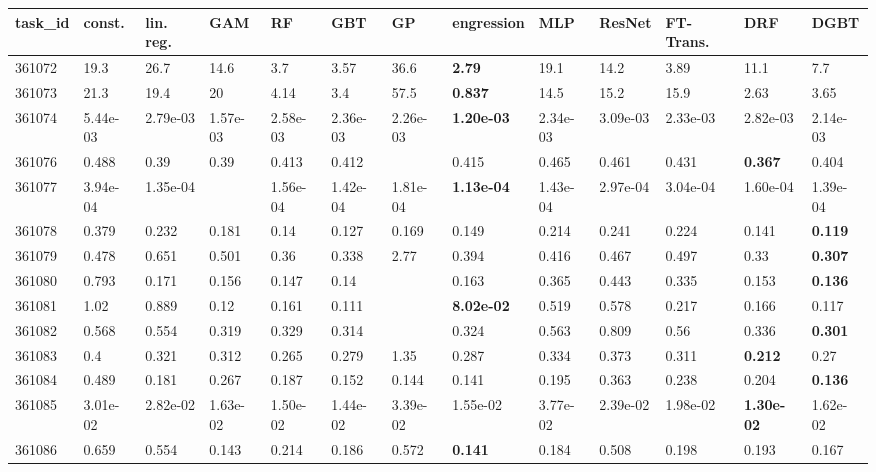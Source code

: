 \begin{table}[ht!]
\centering
\begingroup\footnotesize
\begin{tabular}{lllllllllllll}
  \hline
\hline
task\_id & const. & lin. reg. & GAM & RF & GBT & GP & engression & MLP & ResNet & FT-Trans. & DRF & DGBT \\ 
  \hline
361072 & 19.3 & 26.7 & 14.6 & 3.7 & 3.57 & 36.6 & \textbf{2.79} & 19.1 & 14.2 & 3.89 & 11.1 & 7.7 \\ 
  361073 & 21.3 & 19.4 & 20 & 4.14 & 3.4 & 57.5 & \textbf{0.837} & 14.5 & 15.2 & 15.9 & 2.63 & 3.65 \\ 
  361074 & 5.44e-03 & 2.79e-03 & 1.57e-03 & 2.58e-03 & 2.36e-03 & 2.26e-03 & \textbf{1.20e-03} & 2.34e-03 & 3.09e-03 & 2.33e-03 & 2.82e-03 & 2.14e-03 \\ 
  361076 & 0.488 & 0.39 & 0.39 & 0.413 & 0.412 &  & 0.415 & 0.465 & 0.461 & 0.431 & \textbf{0.367} & 0.404 \\ 
  361077 & 3.94e-04 & 1.35e-04 &  & 1.56e-04 & 1.42e-04 & 1.81e-04 & \textbf{1.13e-04} & 1.43e-04 & 2.97e-04 & 3.04e-04 & 1.60e-04 & 1.39e-04 \\ 
  361078 & 0.379 & 0.232 & 0.181 & 0.14 & 0.127 & 0.169 & 0.149 & 0.214 & 0.241 & 0.224 & 0.141 & \textbf{0.119} \\ 
  361079 & 0.478 & 0.651 & 0.501 & 0.36 & 0.338 & 2.77 & 0.394 & 0.416 & 0.467 & 0.497 & 0.33 & \textbf{0.307} \\ 
  361080 & 0.793 & 0.171 & 0.156 & 0.147 & 0.14 &  & 0.163 & 0.365 & 0.443 & 0.335 & 0.153 & \textbf{0.136} \\ 
  361081 & 1.02 & 0.889 & 0.12 & 0.161 & 0.111 &  & \textbf{8.02e-02} & 0.519 & 0.578 & 0.217 & 0.166 & 0.117 \\ 
  361082 & 0.568 & 0.554 & 0.319 & 0.329 & 0.314 &  & 0.324 & 0.563 & 0.809 & 0.56 & 0.336 & \textbf{0.301} \\ 
  361083 & 0.4 & 0.321 & 0.312 & 0.265 & 0.279 & 1.35 & 0.287 & 0.334 & 0.373 & 0.311 & \textbf{0.212} & 0.27 \\ 
  361084 & 0.489 & 0.181 & 0.267 & 0.187 & 0.152 & 0.144 & 0.141 & 0.195 & 0.363 & 0.238 & 0.204 & \textbf{0.136} \\ 
  361085 & 3.01e-02 & 2.82e-02 & 1.63e-02 & 1.50e-02 & 1.44e-02 & 3.39e-02 & 1.55e-02 & 3.77e-02 & 2.39e-02 & 1.98e-02 & \textbf{1.30e-02} & 1.62e-02 \\ 
  361086 & 0.659 & 0.554 & 0.143 & 0.214 & 0.186 & 0.572 & \textbf{0.141} & 0.184 & 0.508 & 0.198 & 0.193 & 0.167 \\ 

\end{tabular}
\end{table}
